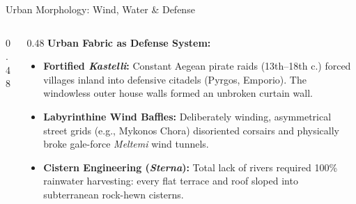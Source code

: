 \begin{frame}[label=defense]{Urban Morphology: Wind, Water \& Defense}
  \begin{columns}[T, onlytextwidth]
    \begin{column}{0.48\textwidth}
    \end{column}

    \begin{column}{0.48\textwidth}
      \textbf{\color{aegeanblue}Urban Fabric as Defense System:}
      \vspace{0.2em}
      \begin{itemize}
          \setlength{\itemsep}{0.25em}
        \item \textbf{Fortified \textit{Kastelli}:} Constant Aegean pirate raids (13th--18th c.) forced villages inland into defensive citadels (Pyrgos, Emporio). The windowless outer house walls formed an unbroken curtain wall.
        \item \textbf{Labyrinthine Wind Baffles:} Deliberately winding, asymmetrical street grids (e.g., Mykonos Chora) disoriented corsairs and physically broke gale-force \textit{Meltemi} wind tunnels.
        \item \textbf{Cistern Engineering (\textit{Sterna}):} Total lack of rivers required 100\% rainwater harvesting: every flat terrace and roof sloped into subterranean rock-hewn cisterns.
      \end{itemize}
    \end{column}
  \end{columns}
\end{frame}

